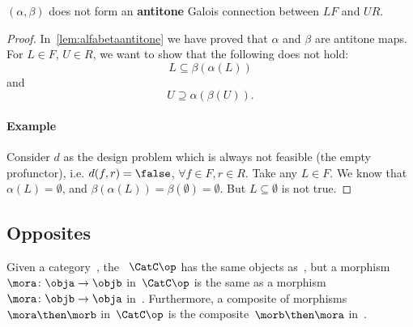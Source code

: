 

\begin{lemma}
    $(\alpha, \beta)$ does not form an \textbf{antitone} Galois connection between $LF$ and $UR$.
\end{lemma}
\begin{proof}
    In~\cref{lem:alfabetaantitone} we have proved that $\alpha$ and $\beta$ are antitone maps. For $L\in F$, $U\in R$, we want to show that the following does not hold:
    \begin{equation}
        \label{eq:alfabetafirst}
        L\subseteq \beta(\alpha(L))
    \end{equation}
    and
    \begin{equation}
        \label{eq:alfabetasec}
        U\supseteq \alpha(\beta(U)).
    \end{equation}

    \paragraph{Example} Consider $d$ as the design problem which is always not feasible (the empty profunctor), i.e. $d(f,r)=\false$, $\forall f\in F,r\in R$. Take any $L\in F$. We know that $\alpha(L)=\emptyset$, and $\beta(\alpha(L))=\beta(\emptyset)=\emptyset$. But $L\subseteq \emptyset$ is not true.

\end{proof}

\subsection{Opposites}

\begin{ctdefinition}
    \label{def:oppositecat}
    Given a category~\CatC, the \emph{}~$\CatC\op$ has the same objects as~\CatC, but a morphism~$\mora\colon \obja\to \objb$ in~$\CatC\op$ is the same as a morphism~$\mora\colon \objb\to \obja$ in~\CatC. Furthermore, a composite of morphisms~$\mora \then \morb$ in~$\CatC\op$ is the composite~$\morb\then \mora$ in~\CatC.
\end{ctdefinition}

